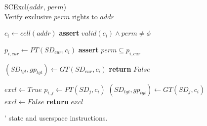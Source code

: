 \begin{figure*}[!t]
\begin{multicols}{2}
    \begin{algorithm}[H]
      \caption{SCExcl($addr$, $perm$) \\
      Verify exclusive $perm$ rights to $addr$       }
      \begin{algorithmic}[1]

        \State $c_i \gets cell(addr)$
        \State \textbf{assert} $valid(c_i) \land perm \ne \phi$

        \State $p_{i,cur} \gets PT(SD_{cur}, c_i) $
        \State \textbf{assert} $perm \subseteq p_{i,cur}$

        \State $ (SD_{tgt}, gp_{tgt}) \gets GT(SD_{cur}, c_i)$
          \State \textbf{return} $False$
        \EndIf

        \State $excl \gets True$
          \State $p_{i,j} \gets PT(SD_j, c_i)$
          \State $(SD_{tgt}, gp_{tgt}) \gets GT(SD_j, c_i)$
            \State $excl \gets False$
          \EndIf
        \EndFor
        \State \textbf{return} $excl$
      \end{algorithmic}
      \label{alg:sccount}
    \end{algorithm}
    \vspace{-\baselineskip}
  \end{multicols}

  \caption{\seccells' state and userspace instructions.}
  \label{fig:seccell_ops_formal}
\end{figure*}
